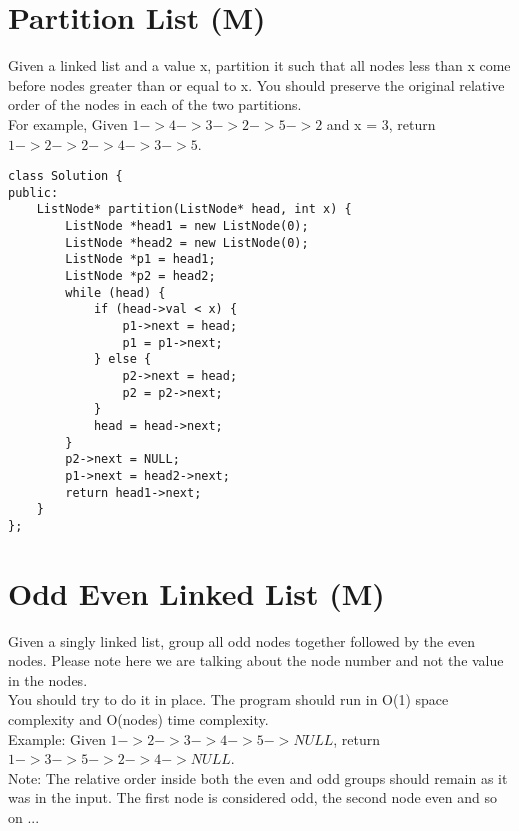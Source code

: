 \section{Partition List (M)}
Given a linked list and a value x, partition it such that all nodes less than x come before nodes greater than or equal to x. You should preserve the original relative order of the nodes in each of the two partitions.\\

For example,
Given $1->4->3->2->5->2$ and x = 3,
return $1->2->2->4->3->5$. \\

\begin{lstlisting}
class Solution {
public:
    ListNode* partition(ListNode* head, int x) {
        ListNode *head1 = new ListNode(0);
        ListNode *head2 = new ListNode(0);
        ListNode *p1 = head1;
        ListNode *p2 = head2;
        while (head) {
            if (head->val < x) {
                p1->next = head;
                p1 = p1->next;
            } else {
                p2->next = head;
                p2 = p2->next;
            }
            head = head->next;
        }
        p2->next = NULL;
        p1->next = head2->next;
        return head1->next;
    }
};
\end{lstlisting}


\section{Odd Even Linked List (M)}
Given a singly linked list, group all odd nodes together followed by the even nodes. Please note here we are talking about the node number and not the value in the nodes.\\

You should try to do it in place. The program should run in O(1) space complexity and O(nodes) time complexity.\\

Example:
Given $1->2->3->4->5->NULL$, return $1->3->5->2->4->NULL$.\\

Note:
The relative order inside both the even and odd groups should remain as it was in the input.
The first node is considered odd, the second node even and so on ... \\

